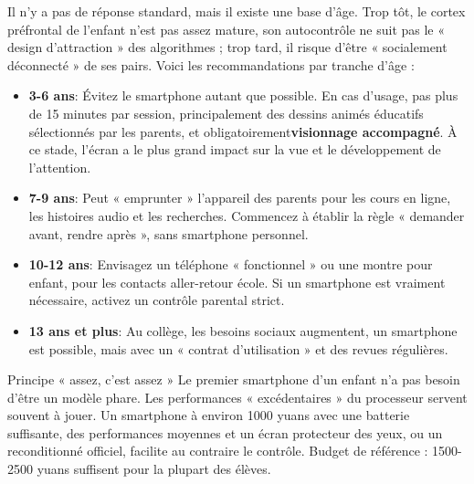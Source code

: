 


Il n'y a pas de réponse standard, mais il existe une base d'âge. Trop tôt, le cortex préfrontal de l'enfant n'est pas assez mature, son autocontrôle ne suit pas le « design d'attraction » des algorithmes ; trop tard, il risque d'être « socialement déconnecté » de ses pairs. Voici les recommandations par tranche d'âge :

\begin{itemize}
  \item \textbf{3-6 ans}: Évitez le smartphone autant que possible. En cas d'usage, pas plus de 15 minutes par session, principalement des dessins animés éducatifs sélectionnés par les parents, et obligatoirement\textbf{visionnage accompagné}. À ce stade, l'écran a le plus grand impact sur la vue et le développement de l'attention.
  \item \textbf{7-9 ans}: Peut « emprunter » l'appareil des parents pour les cours en ligne, les histoires audio et les recherches. Commencez à établir la règle « demander avant, rendre après », sans smartphone personnel.
  \item \textbf{10-12 ans}: Envisagez un téléphone « fonctionnel » ou une montre pour enfant, pour les contacts aller-retour école. Si un smartphone est vraiment nécessaire, activez un contrôle parental strict.
  \item \textbf{13 ans et plus}: Au collège, les besoins sociaux augmentent, un smartphone est possible, mais avec un « contrat d'utilisation » et des revues régulières.
\end{itemize}

\begin{tcbinfo}{Principe « assez, c'est assez »}
Le premier smartphone d'un enfant n'a pas besoin d'être un modèle phare. Les performances « excédentaires » du processeur servent souvent à jouer. Un smartphone à environ 1000 yuans avec une batterie suffisante, des performances moyennes et un écran protecteur des yeux, ou un reconditionné officiel, facilite au contraire le contrôle. Budget de référence : 1500-2500 yuans suffisent pour la plupart des élèves.

\end{tcbinfo}


